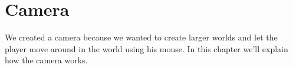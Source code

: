 \section{Camera}
\label{sec:camera}

We created a camera because we wanted to create larger worlds and let the 
player move around in the world using his mouse. In this chapter we'll 
explain how the camera works.



